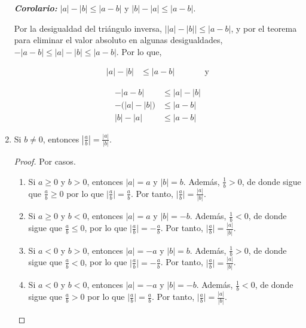 \documentclass[11pt]{article}
\newcommand{\bfit}[1]{\textbf{\textit{#1}}}
\begin{document}
\begin{enumerate}[label=\alph*)]
    \bfit{Corolario:} $|a|-|b|\leq |a-b|$ y $|b|-|a|\leq |a-b|$.

    Por la desigualdad del triángulo inversa, $\big| |a|-|b| \big| \leq |a-b|$, y por el teorema para eliminar el valor absoluto en algunas desigualdades, $-|a-b|\leq |a|-|b|\leq |a-b|$. Por lo que,
    \begin{center}\vspace{-2.5em}
        \begin{minipage}[t]{.3\linewidth}
        \begin{align*}
            |a|-|b| &\leq |a-b| && \qquad \text{y}
        \end{align*}
        \end{minipage}%
        \begin{minipage}[t]{.3\linewidth}
        \begin{align*}
            -|a-b| &\leq |a|-|b|\\
            -\bigl(|a|-|b|\bigr) &\leq |a-b| \\
            |b|-|a| &\leq |a-b|
        \end{align*}
        \end{minipage}
        \end{center}

\item Si $b\neq 0$, entonces $\left| \frac{a}{b} \right| = \frac{|a|}{|b|}$.

\vspace{-1em}\begin{proof} Por casos.
    \begin{enumerate}[label=\roman*)]
        \item Si $a \geq 0$ y $b>0$, entonces $|a|=a$ y $|b|=b$. Además, $\frac{1}{b} >0$, de donde sigue que $\frac{a}{b} \geq 0$ por lo que $\big| \frac{a}{b} \big| = \frac{a}{b}$. Por tanto, $ \big| \frac{a}{b} \big| = \frac{|a|}{|b|}$.
        \item Si $a \geq 0$ y $b<0$, entonces $|a|=a$ y $|b|=-b$. Además, $\frac{1}{b} <0$, de donde sigue que $\frac{a}{b} \leq 0$, por lo que $\big| \frac{a}{b} \big| =- \frac{a}{b}$. Por tanto, $ \big| \frac{a}{b} \big| = \frac{|a|}{|b|}$.
        \item Si $a<0$ y $b>0$, entonces $|a|=-a$ y $|b|=b$. Además, $\frac{1}{b} >0$, de donde sigue que $\frac{a}{b} < 0$, por lo que $\big| \frac{a}{b} \big| =- \frac{a}{b}$. Por tanto, $ \big| \frac{a}{b} \big| = \frac{|a|}{|b|}$.
        \item Si $a<0$ y $b<0$, entonces $|a|=-a$ y $|b|=-b$. Además, $\frac{1}{b} <0$, de donde sigue que $\frac{a}{b} > 0$ por lo que $\big| \frac{a}{b} \big| = \frac{a}{b}$. Por tanto, $ \big| \frac{a}{b} \big| = \frac{|a|}{|b|}$. \qedhere
    \end{enumerate}    
\end{proof} \vspace{-1em}

\end{enumerate}
\end{document}
